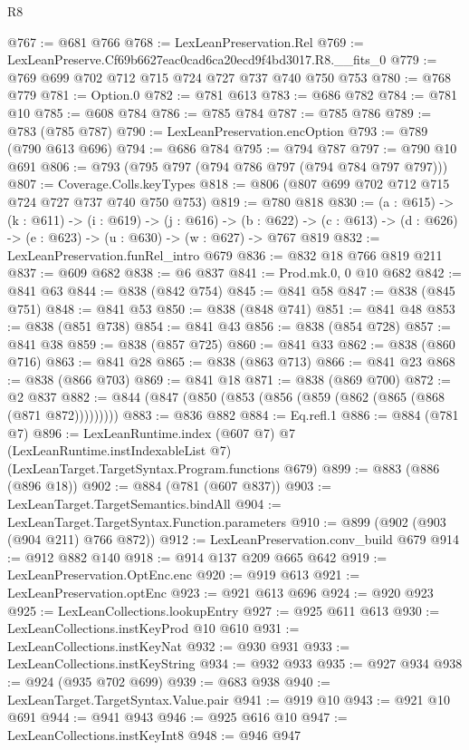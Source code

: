 \begin{lexlean}{R8}
\begin{coremodule}
@767 := @681 @766
@768 := LexLeanPreservation.Rel
@769 := LexLeanPreserve.Cf69b6627eac0cad6ca20ecd9f4bd3017.R8.__fits_0
@779 := @769 @699 @702 @712 @715 @724 @727 @737 @740 @750 @753
@780 := @768 @779
@781 := Option.{0}
@782 := @781 @613
@783 := @686 @782
@784 := @781 @10
@785 := @608 @784
@786 := @785 @784
@787 := @785 @786
@789 := @783 (@785 @787)
@790 := LexLeanPreservation.encOption
@793 := @789 (@790 @613 @696)
@794 := @686 @784
@795 := @794 @787
@797 := @790 @10 @691
@806 := @793 (@795 @797 (@794 @786 @797 (@794 @784 @797 @797)))
@807 := Coverage.Colls.keyTypes
@818 := @806 (@807 @699 @702 @712 @715 @724 @727 @737 @740 @750 @753)
@819 := @780 @818
@830 := (a : @615) ->
  (k : @611) ->
  (i : @619) ->
  (j : @616) ->
  (b : @622) -> (c : @613) -> (d : @626) -> (e : @623) -> (u : @630) -> (w : @627) -> @767 @819
@832 := LexLeanPreservation.funRel_intro @679
@836 := @832 @18 @766 @819 @211
@837 := @609 @682
@838 := @6 @837
@841 := Prod.mk.{0, 0} @10 @682
@842 := @841 @63
@844 := @838 (@842 @754)
@845 := @841 @58
@847 := @838 (@845 @751)
@848 := @841 @53
@850 := @838 (@848 @741)
@851 := @841 @48
@853 := @838 (@851 @738)
@854 := @841 @43
@856 := @838 (@854 @728)
@857 := @841 @38
@859 := @838 (@857 @725)
@860 := @841 @33
@862 := @838 (@860 @716)
@863 := @841 @28
@865 := @838 (@863 @713)
@866 := @841 @23
@868 := @838 (@866 @703)
@869 := @841 @18
@871 := @838 (@869 @700)
@872 := @2 @837
@882 := @844 (@847 (@850 (@853 (@856 (@859 (@862 (@865 (@868 (@871 @872)))))))))
@883 := @836 @882
@884 := Eq.refl.{1}
@886 := @884 (@781 @7)
@896 := LexLeanRuntime.index
    (@607 @7)
    @7
    (LexLeanRuntime.instIndexableList @7)
    (LexLeanTarget.TargetSyntax.Program.functions @679)
@899 := @883 (@886 (@896 @18))
@902 := @884 (@781 (@607 @837))
@903 := LexLeanTarget.TargetSemantics.bindAll
@904 := LexLeanTarget.TargetSyntax.Function.parameters
@910 := @899 (@902 (@903 (@904 @211) @766 @872))
@912 := LexLeanPreservation.conv_build @679
@914 := @912 @882 @140
@918 := @914 @137 @209 @665 @642
@919 := LexLeanPreservation.OptEnc.enc
@920 := @919 @613
@921 := LexLeanPreservation.optEnc
@923 := @921 @613 @696
@924 := @920 @923
@925 := LexLeanCollections.lookupEntry
@927 := @925 @611 @613
@930 := LexLeanCollections.instKeyProd @10 @610
@931 := LexLeanCollections.instKeyNat
@932 := @930 @931
@933 := LexLeanCollections.instKeyString
@934 := @932 @933
@935 := @927 @934
@938 := @924 (@935 @702 @699)
@939 := @683 @938
@940 := LexLeanTarget.TargetSyntax.Value.pair
@941 := @919 @10
@943 := @921 @10 @691
@944 := @941 @943
@946 := @925 @616 @10
@947 := LexLeanCollections.instKeyInt8
@948 := @946 @947

\end{coremodule}
\end{lexlean}
